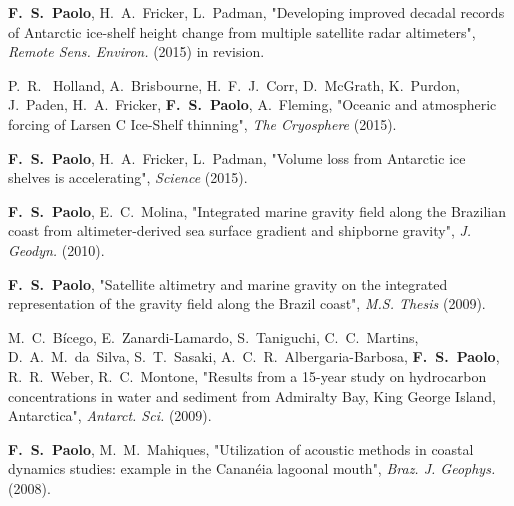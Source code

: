 \begin{frontmatter}
\begin{vitapage}
\begin{publications}
  \item {\bf F.~S.~Paolo}, H.~A.~Fricker, L.~Padman, "Developing improved
        decadal records of Antarctic ice-shelf height change from multiple
        satellite radar altimeters", \emph{Remote Sens. Environ.} (2015) in revision.
  \item P.~R.~ Holland, A.~Brisbourne, H.~F.~J.~Corr, D.~McGrath, K.~Purdon, 
        J.~Paden, H.~A.~Fricker, {\bf F.~S.~Paolo}, A.~Fleming, "Oceanic and 
        atmospheric forcing of Larsen C Ice-Shelf thinning", \emph{The Cryosphere} 
        (2015).
  \item {\bf F.~S.~Paolo}, H.~A.~Fricker, L.~Padman, "Volume loss 
        from Antarctic ice shelves is accelerating", \emph{Science} (2015).
  \item {\bf F.~S.~Paolo}, E.~C.~Molina, "Integrated marine 
        gravity field along the Brazilian coast from altimeter-derived sea 
        surface gradient and shipborne gravity", \emph{J. Geodyn.} (2010).
  \item {\bf F.~S.~Paolo}, "Satellite altimetry and marine gravity on the
        integrated representation of the gravity field along the Brazil coast",
        {\it M.S. Thesis} (2009).
  \item M.~C.~B\'icego, E.~Zanardi-Lamardo, S.~Taniguchi, C.~C.~Martins, 
        D.~A.~M.~da~Silva, S.~T.~Sasaki, A.~C.~R.~Albergaria-Barbosa, {\bf F.~S.~Paolo},
        R.~R.~Weber, R.~C.~Montone, "Results from a 15-year 
        study on hydrocarbon concentrations in water and sediment from 
        Admiralty Bay, King George Island, Antarctica", \emph{Antarct. Sci.} 
        (2009).
  \item {\bf F.~S.~Paolo}, M.~M.~Mahiques, "Utilization of 
        acoustic methods in coastal dynamics studies: example in the 
        Canan\'eia lagoonal mouth", \emph{Braz. J. Geophys.} (2008).
\end{publications}


\end{vitapage}
\end{frontmatter}
